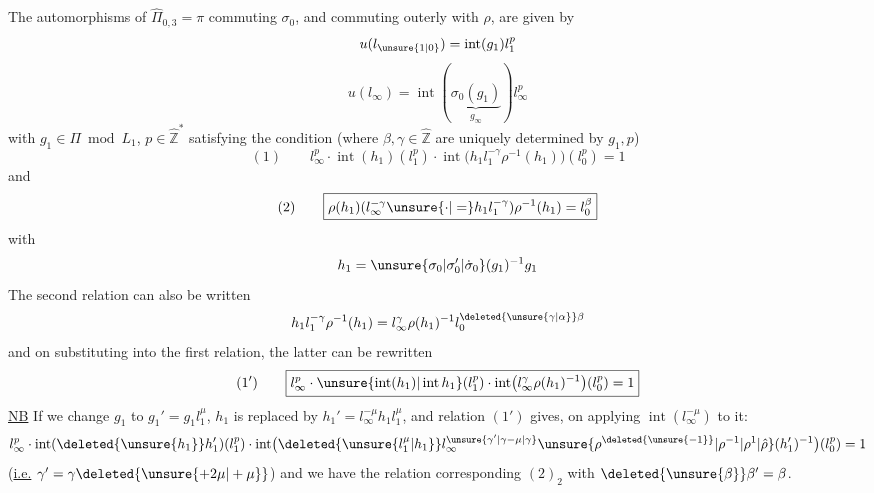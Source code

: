 The automorphisms  of $\hat\Pi_{0,3}=\pi$ commuting  $\sigma_0$, and commuting outerly with $\rho$, are given by
\[
u(l_{\unsure{1|0}})=\operatorname{int}(g_1)l_1^{p}
\]
\[
u(l_\infty)=\operatorname{int}(\underbrace{\sigma_0(g_1)}_{g_\infty})l_\infty^{p}
\]
with $g_1\in\Pi\bmod L_1$, $p\in\hat{\mathbb Z}^{*}$ satisfying the condition (where $\beta,\gamma\in\hat{\mathbb Z}$ are uniquely determined by $g_1,p$)
\[
(1)\qquad\boxed{l_\infty^{p}\cdot\operatorname{int}(h_1)(l_1^{p})\cdot\operatorname{int}\bigl(h_1l_1^{-\gamma}\rho^{-1}(h_1)\bigr)(l_0^{p})=1}
\]
and
\[
(2)\qquad\boxed{\rho(h_1)(l_\infty^{-\gamma}\unsure{\cdot|=} h_1l_1^{-\gamma})\rho^{-1}(h_1)=l_0^\beta}
\]
with
\[
h_1=\unsure{\sigma_0|\sigma_0'|\dot\sigma_0}(g_1)^{-1}g_1
\]
The second relation can also be written
\[
h_1l_1^{-\gamma}\rho^{-1}(h_1)=l_\infty^\gamma\rho(h_1)^{-1}l_0^{\deleted{\unsure{\gamma|\alpha}}\beta}
\]
and on substituting into the first relation, the latter can be rewritten
\[
(1')\qquad\boxed{l_\infty^{p}\cdot\unsure{\operatorname{int}(h_1)|\operatorname{int}h_1}(l_1^{p})\cdot\operatorname{int}\bigl(l_\infty^\gamma\rho(h_1)^{-1}\bigr)(l_0^{p})=1}
\]
\uline{NB} If we change $g_1$ to $g_1'=g_1l_1^\mu$, $h_1$ is replaced by $h_1'=l_\infty^{-\mu}h_1l_1^\mu$, and relation $(1')$ gives, on applying $\operatorname{int}(l_\infty^{-\mu})$ to it:
\[
l_\infty^{p}\cdot\operatorname{int}(\deleted{\unsure{h_1}}h_1')(l_1^{p})\cdot\operatorname{int}\bigl(\deleted{\unsure{l_1^\mu|h_1}}l_\infty^{\unsure{\gamma'|\gamma-\mu|\gamma}}\unsure{\rho^{\deleted{\unsure{-1}}}|\rho^{-1}|\rho^1|\hat\rho}(h_1')^{-1}\bigr)(l_0^{p})=1
\]
(\uline{i.e.} \uline{$\gamma'=\gamma\deleted{\unsure{+2\mu|+\mu}}$}) and we have the relation corresponding  $(2)_2$ with $\deleted{\unsure{\beta}}\beta'=\beta$.
